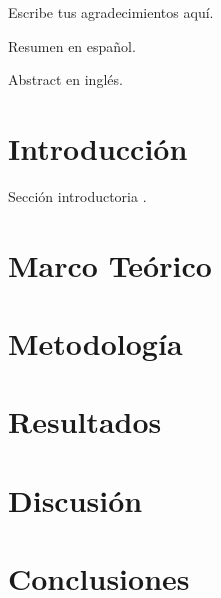\documentclass[12pt]{report}
\begin{document}
\PUCVTitlePage

Escribe tus agradecimientos aquí.

Resumen en español.

Abstract en inglés.

\tableofcontents
\newpage

\chapter{Introducción}
Sección introductoria \cite{de2018statistical}.

\chapter{Marco Teórico}
\lipsum[3-4]

\chapter{Metodología}
\lipsum[5-6]

\chapter{Resultados}
\lipsum[7-8]

\chapter{Discusión}
\lipsum[9]

\chapter{Conclusiones}
\lipsum[10]

\end{document}
